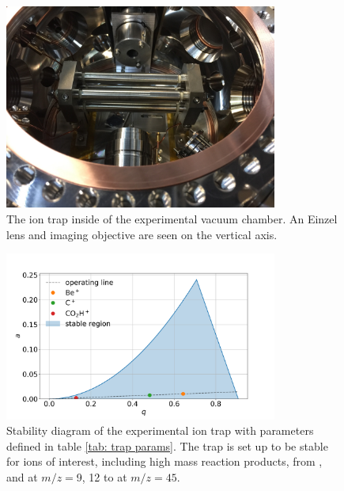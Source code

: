 \begin{figure}[H]
	\centering
	\includegraphics[width=0.8\textwidth]{images/ion_trap.jpg}
	\caption{The ion trap inside of the experimental vacuum chamber. An Einzel lens and imaging objective are seen on the vertical axis.}
\end{figure}

\begin{figure}[H]
	\centering
	\includegraphics[width=0.8\textwidth]{images/stability.png}
	\caption{Stability diagram of the experimental ion trap with parameters defined in table \ref{tab: trap params}. The trap is set up to be stable for ions of interest, including high mass reaction products, from , and  at $m/z=$9, 12 to  at $m/z=45$.}
	\label{fig: stability}
\end{figure}